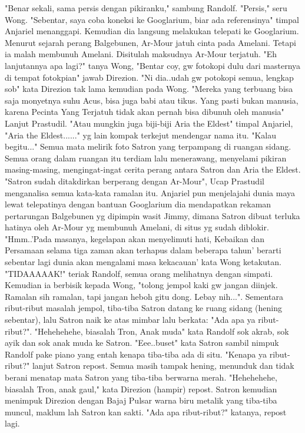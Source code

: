 \documentclass[a4paper,11pt,final]{article}
\begin{document}
"Benar sekali, sama persis dengan pikiranku," sambung Randolf. "Persis," seru Wong.
"Sebentar, saya coba koneksi ke Googlarium, biar ada referensinya" timpal Anjariel menanggapi. Kemudian dia langsung melakukan telepati ke Googlarium.
Menurut sejarah perang Balgebunen, Ar-Mour jatuh cinta pada Amelani. Tetapi ia malah membunuh Amelani. Disitulah maksudnya Ar-Mour terjatuh.
"Eh lanjutannya apa lagi?" tanya Wong, "Bentar coy, gw fotokopi dulu dari masternya di tempat fotokpian" jawab Direzion.
"Ni dia..udah gw potokopi semua, lengkap sob" kata Direzion tak lama kemudian pada Wong.
"Mereka yang terbuang bisa saja monyetnya suhu Acus, bisa juga babi atau tikus. Yang pasti bukan manusia, karena Pecinta Yang Terjatuh tidak akan pernah bisa dibunuh oleh manusia" Lanjut Prastudil.
"Atau mungkin juga biji-biji Aria the Eldest" timpal Anjariel, "Aria the Eldest......" yg lain kompak terkejut mendengar nama itu.
"Kalau begitu..." Semua mata melirik foto Satron yang terpampang di ruangan sidang.
Semua orang dalam ruangan itu terdiam lalu menerawang, menyelami pikiran masing-masing, mengingat-ingat cerita perang antara Satron dan Aria the Eldest.
"Satron sudah ditakdirkan berperang dengan Ar-Mour", Ucap Prastudil menganalisa semua kata-kata ramalan itu.
Anjariel pun menjelajahi dunia maya lewat telepatinya dengan bantuan Googlarium dia mendapatkan rekaman pertarungan Balgebunen yg dipimpin wasit Jimmy, dimana Satron dibuat terluka hatinya oleh Ar-Mour yg membunuh Amelani, di situs yg sudah diblokir.
"Hmm..'Pada masanya, kegelapan akan menyelimuti hati, Kebaikan dan Persamaan selama tiga zaman akan terhapus dalam beberapa tahun' berarti sebentar lagi dunia akan mengalami masa kekacauan' kata Wong ketakutan.
"TIDAAAAAK!" teriak Randolf, semua orang melihatnya dengan simpati. Kemudian ia berbisik kepada Wong, "tolong jempol kaki gw jangan diinjek. Ramalan sih ramalan, tapi jangan heboh gitu dong. Lebay nih...".
Sementara ribut-ribut masalah jempol, tiba-tiba Satron datang ke ruang sidang (hening sebentar), lalu Satron naik ke atas mimbar lalu berkata: "Ada apa ya ribut-ribut?".
"Hehehehehe, biasalah Tron, Anak muda" kata Randolf sok akrab, sok ayik dan sok anak muda ke Satron.
"Eee..buset" kata Satron sambil nimpuk Randolf pake piano yang entah kenapa tiba-tiba ada di situ. "Kenapa ya ribut-ribut?" lanjut Satron repost. Semua masih tampak hening, menunduk dan tidak berani menatap mata Satron yang tiba-tiba berwarna merah.
"Hehehehehe, biasalah Tron, anak gaul," kata Direzion (hampir) repost. Satron kemudian menimpuk Direzion dengan Bajaj Pulsar warna biru metalik yang tiba-tiba muncul, maklum lah Satron kan sakti. "Ada apa ribut-ribut?" katanya, repost lagi.
\end{document}
